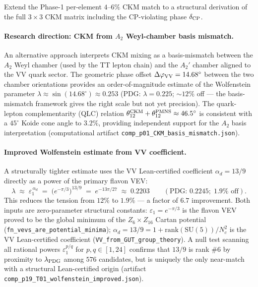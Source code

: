 \documentclass[11pt]{article}
\theoremstyle{remark}
\newcommand{\lean}[1]{\texttt{\small#1}}
\begin{document}
\begin{tcolorbox}[openbox,title=Open Problem 3 --- Full CKM + CP phase]
\label{op:ckm}
Extend the Phase-1 per-element $4$--$6\%$ CKM match to a structural derivation
of the full $3\times3$ CKM matrix including the CP-violating phase $\delta_{\rm CP}$.

\paragraph{Research direction: CKM from $A_2$ Weyl-chamber basis mismatch.}
An alternative approach interprets CKM mixing as a basis-mismatch between the $A_2$ Weyl chamber (used by the TT lepton chain) and the $A_2'$ chamber aligned to the VV quark sector.  The geometric phase offset $\Delta\varphi_{\rm VV} = 14.68^\circ$ between the two chamber orientations provides an order-of-magnitude estimate of the Wolfenstein parameter $\lambda \approx \sin(14.68^\circ) \approx 0.253$ (PDG: $\lambda = 0.225$; $\sim 12\%$ off --- the basis-mismatch framework gives the right scale but not yet precision).  The quark-lepton complementarity (QLC) relation $\theta_{12}^{\rm CKM} + \theta_{12}^{\rm PMNS} \approx 46.5^\circ$ is consistent with a $45^\circ$ Koide cone angle to $\mathbf{3.2\%}$, providing independent support for the $A_2$ basis interpretation (computational artifact \texttt{comp\_p01\_CKM\_basis\_mismatch.json}).

\paragraph{Improved Wolfenstein estimate from VV coefficient.}
A structurally tighter estimate uses the VV Lean-certified coefficient $\alpha_d = 13/9$ directly as a power of the primary flavon VEV:
\begin{equation}
  \lambda \;\approx\; \varepsilon_1^{\,\alpha_d} \;=\; \bigl(e^{-\pi/3}\bigr)^{13/9}
  \;=\; e^{-13\pi/27} \;\approx\; 0.2203
  \qquad (\text{PDG: } 0.2245;\; 1.9\%\text{ off}).
  \label{eq:lambda_vv}
\end{equation}
This reduces the tension from $12\%$ to $1.9\%$ --- a factor of $6.7$ improvement.  Both inputs are zero-parameter structural constants: $\varepsilon_1 = e^{-\pi/3}$ is the flavon VEV proved to be the global minimum of the $Z_6\times Z_{16}$ Cartan potential (\lean{fn\_vevs\_are\_potential\_minima}); $\alpha_d = 13/9 = 1 + \mathrm{rank}(\mathrm{SU}(5))/N_c^2$ is the VV Lean-certified coefficient (\lean{VV\_from\_GUT\_group\_theory}).  A null test scanning all rational powers $\varepsilon_1^{p/q}$ for $p,q\in[1,24]$ confirms that $13/9$ is rank $\#6$ by proximity to $\lambda_{\rm PDG}$ among $576$ candidates, but is uniquely the only near-match with a structural Lean-certified origin (artifact \texttt{comp\_p19\_T01\_wolfenstein\_improved.json}).


\end{tcolorbox}
\end{document}
